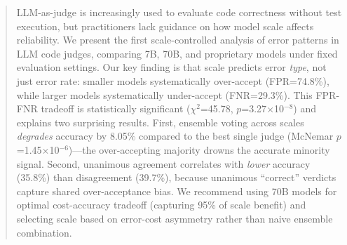 \begin{abstract}
LLM-as-judge is increasingly used to evaluate code correctness without test execution, but practitioners lack guidance on how model scale affects reliability. We present the first scale-controlled analysis of error patterns in LLM code judges, comparing 7B, 70B, and proprietary models under fixed evaluation settings. Our key finding is that scale predicts error \textit{type}, not just error rate: smaller models systematically over-accept (FPR=74.8\%), while larger models systematically under-accept (FNR=29.3\%). This FPR-FNR tradeoff is statistically significant ($\chi^2$=45.78, $p$=3.27$\times$10$^{-8}$) and explains two surprising results. First, ensemble voting across scales \textit{degrades} accuracy by 8.05\% compared to the best single judge (McNemar $p$=1.45$\times$10$^{-6}$)---the over-accepting majority drowns the accurate minority signal. Second, unanimous agreement correlates with \textit{lower} accuracy (35.8\%) than disagreement (39.7\%), because unanimous ``correct'' verdicts capture shared over-acceptance bias. We recommend using 70B models for optimal cost-accuracy tradeoff (capturing 95\% of scale benefit) and selecting scale based on error-cost asymmetry rather than naive ensemble combination.
\end{abstract}
